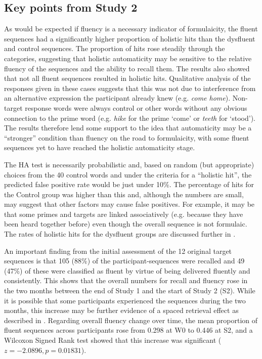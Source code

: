 \documentclass[output=paper]{langscibook}
\begin{document}
\subsection{Key points from Study 2}\label{sec:cutler:3.5}

As would be expected if fluency is a necessary indicator of formulaicity, the fluent sequences had a significantly higher proportion of holistic hits than the dysfluent and control sequences. The proportion of hits rose steadily through the categories, suggesting that holistic automaticity may be sensitive to the relative fluency of the sequences and the ability to recall them. The results also showed that not all fluent sequences resulted in holistic hits. Qualitative analysis of the responses given in these cases suggests that this was not due to interference from an alternative expression the participant already knew (e.g. \textit{come home}). Non-target response words were always control or other words without any obvious connection to the prime word (e.g. \textit{hike} for the prime ‘come’ or \textit{teeth} for ‘stood’). The results therefore lend some support to the idea that automaticity may be a ``stronger'' condition than fluency on the road to formulaicity, with some fluent sequences yet to have reached the holistic automaticity stage. 

The HA test is necessarily probabilistic and, based on random (but appropriate) choices from the 40 control words and under the criteria for a ``holistic hit'', the predicted false positive rate would be just under 10\%. The percentage of hits for the Control group was higher than this and, although the numbers are small, may suggest that other factors may cause false positives. For example, it may be that some primes and targets are linked associatively (e.g. because they have been heard together before) even though the overall sequence is not formulaic. The rates of holistic hits for the dysfluent groups are discussed further in .

An important finding from the initial assessment of the 12 original target sequences is that 105 (88\%) of the participant-sequences were recalled and 49 (47\%) of these were classified as fluent by virtue of being delivered fluently and consistently. This shows that the overall numbers for recall and fluency rose in the two months between the end of Study 1 and the start of Study 2 (S2). While it is possible that some participants experienced the sequences during the two months, this increase may be further evidence of a spaced retrieval effect as described in . Regarding overall fluency change over time, the mean proportion of fluent sequences across participants rose from 0.298 at W0 to 0.446 at S2, and a Wilcoxon Signed Rank test showed that this increase was significant ($z=-2.0896, p= 0.01831$).
\end{document}
